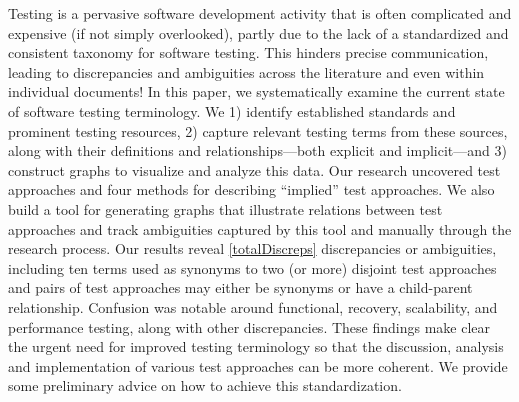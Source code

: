 \label{abstract}%
Testing is a pervasive software development activity that is often
complicated and expensive (if not simply overlooked), partly due to
the lack of a standardized and consistent taxonomy for software testing.
This hinders precise communication, leading to discrepancies and
ambiguities across the literature and even within individual documents!
In this paper, we systematically examine the current state of software
testing terminology. We 1) identify established standards
and prominent testing resources, 2) capture relevant testing terms
from these sources, along with their definitions and relationships---both
explicit and implicit---and 3) construct graphs to visualize and analyze
this data. Our research uncovered \approachCount{} test approaches and
four methods for describing ``implied'' test approaches. We also build
a tool for generating graphs that illustrate relations between test
approaches and track ambiguities captured by this tool and manually through
the research process. Our results reveal \ref*{totalDiscreps} discrepancies
or ambiguities, including ten terms used as synonyms to two (or more)
disjoint test approaches and \parSynCount{} pairs of test approaches may
either be synonyms or have a child-parent relationship. Confusion was notable
around functional, recovery, scalability, and performance testing, along
with  other discrepancies. These findings make clear
the urgent need for improved testing terminology so that the discussion,
analysis and implementation of various test approaches can be more coherent.
We provide some preliminary advice on how to achieve this standardization.